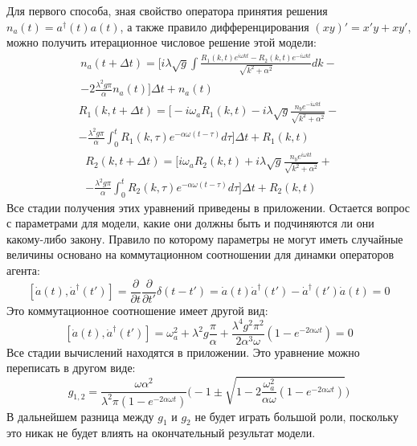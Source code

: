 Для первого способа, зная свойство оператора принятия решения $n_{a}(t) = a^{\dagger}(t) a(t)$, а также правило
дифференцирования $(xy)' = x'y + xy'$, можно получить итерационное числовое решение этой модели:
\begin{multline}
    n_{a}(t + \Delta t) =
    \Biggl[i \lambda \sqrt{g} \int \frac{R_{1}(k,t) e^{i \omega k t} - R_{2}(k,t) e^{-i \omega k t}}{\sqrt{k^{2} + \alpha^2}} dk - \\
    - 2 \frac{\lambda^{2} g \pi}{\alpha} n_{a}(t) \Biggr] \Delta t + n_{a}(t)
\end{multline}
\begin{multline}
    R_{1}(k,t + \Delta t) =
    \Biggl[-i \omega_{a} R_{1}(k,t)
    -i \lambda \sqrt{g} \frac{n_{b} e^{-i \omega k t}}{\sqrt{k^{2} + \alpha^2}} - \\
    -\frac{\lambda^{2} g \pi}{\alpha} \int_{0}^{t} R_{1}(k,\tau) e^{- \alpha \omega (t - \tau)} d\tau \Biggr] \Delta t + R_{1}(k,t)
\end{multline}
\begin{multline}
    R_{2}(k,t + \Delta t) =
    \Biggl[i \omega_{a} R_{2}(k,t)
    + i \lambda \sqrt{g} \frac{n_{b} e^{i \omega k t}}{\sqrt{k^{2} + \alpha^2}} + \\
    - \frac{\lambda^{2} g \pi}{\alpha} \int_{0}^{t} R_{2}(k,\tau) e^{- \alpha \omega (t - \tau)} d\tau \Biggr] \Delta t + R_{2}(k,t)
\end{multline}
Все стадии получения этих уравнений приведены в приложении.
Остается вопрос с параметрами для модели, какие они должны быть и подчиняются ли они какому-либо закону.
Правило по которому параметры не могут иметь случайные величины основано на коммутационном соотношении
для динамки операторов агента:
\begin{equation}\label{dynamic_comm-1}
    [\dot{a}(t),\dot{a}^{\dagger}(t')] = \frac{\partial}{\partial t} \frac{\partial}{\partial t'} \delta (t-t') =
    \dot{a}(t) \dot{a}^{\dagger}(t') - \dot{a}^{\dagger}(t') \dot{a}(t) = 0
\end{equation}
Это коммутационное соотношение имеет другой вид:
\begin{equation}\label{dynamic_comm}
    [\dot{a}(t),\dot{a}^{\dagger}(t')] = \omega^{2}_{a} + \lambda^{2} g \frac{\pi}{\alpha} +
    \frac{\lambda^{4} g^{2} \pi^{2}}{2 \alpha^{3} \omega} (1-e^{-2 \alpha \omega t}) = 0
\end{equation}
Все стадии вычислений находятся в приложении.
Это уравнение можно переписать в другом виде:
\begin{equation}
    g_{1,2} = \frac{\omega \alpha^{2}}{\lambda^{2} \pi (1-e^{-2 \alpha \omega t})}
    \Biggl( -1 \pm \sqrt{1 - 2 \frac{\omega^{2}_{a} }{\alpha \omega} (1-e^{-2 \alpha \omega t})} \Biggr)
\end{equation}
В дальнейшем разница между $g_{1}$ и $g_{2}$ не будет играть большой роли, поскольку это никак не будет
влиять на окончательный результат модели.


